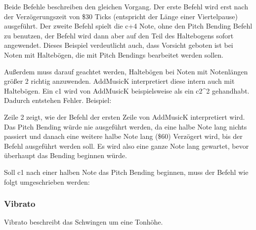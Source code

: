 Beide Befehle beschreiben den gleichen Vorgang. Der erste Befehl wird erst nach der Verzögerungszeit von \$30 Ticks (entspricht der Länge einer Viertelpause) ausgeführt. Der zweite Befehl spielt die c+4 Note, ohne den Pitch Bending Befehl zu benutzen, der Befehl wird dann aber auf den Teil des Haltebogens sofort angewendet. Dieses Beispiel verdeutlicht auch, dass Vorsicht geboten ist bei Noten mit Haltebögen, die mit Pitch Bendings bearbeitet werden sollen.

\bigskip

Außerdem muss darauf geachtet werden, Haltebögen bei Noten mit Notenlängen größer 2 richtig anzuwenden. AddMusicK interpretiert diese intern auch mit Haltebögen. Ein c1 wird von AddMusicK beispielsweise als ein c2\textasciicircum2 gehandhabt. Dadurch entstehen Fehler. Beispiel:

\medskip



\medskip

Zeile 2 zeigt, wie der Befehl der ersten Zeile von AddMusicK interpretiert wird. Das Pitch Bending würde nie ausgeführt werden, da eine halbe Note lang nichts passiert und danach eine weitere halbe Note lang (\$60) Verzögert wird, bis der Befehl ausgeführt werden soll. Es wird also eine ganze Note lang gewartet, bevor überhaupt das Bending beginnen würde.

Soll c1 nach einer halben Note das Pitch Bending beginnen, muss der Befehl wie folgt umgeschrieben werden:

\medskip



\medskip



\subsubsection{Vibrato}

Vibrato beschreibt das Schwingen um eine Tonhöhe.

\medskip



\medskip

